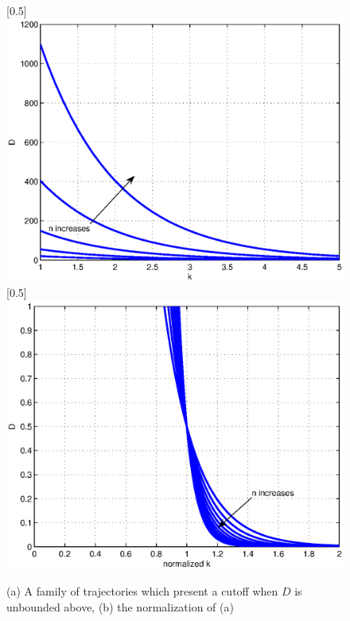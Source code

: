 \documentclass{article}
\begin{document}
\begin{figure}
 \centerline{
  \scalebox{0.5}[0.5]{\includegraphics{democutoff2.eps}}
  \scalebox{0.5}[0.5]{\includegraphics{democutoff2n.eps}}
} \caption{(a) A family of trajectories which present a cutoff when $D$ is unbounded above, (b) the normalization of (a)}
  \label{democutoff2}
\end{figure}


\end{document}
